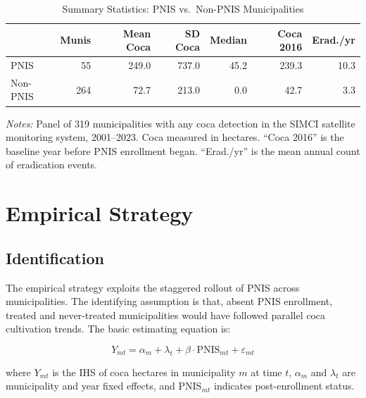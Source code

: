 \documentclass[12pt]{article}
\begin{document}
\begin{table}[H]
\centering
\caption{Summary Statistics: PNIS vs.\ Non-PNIS Municipalities}
\label{tab:summary}
\begin{tabular}{lrrrrrr}
\toprule
 & Munis & Mean Coca & SD Coca & Median & Coca 2016 & Erad./yr \\
\midrule
PNIS & 55 & 249.0 & 737.0 & 45.2 & 239.3 & 10.3 \\
Non-PNIS & 264 & 72.7 & 213.0 & 0.0 & 42.7 & 3.3 \\
\bottomrule
\end{tabular}
\begin{tablenotes}[flushleft]\small
\item \textit{Notes:} Panel of 319 municipalities with any coca detection in the SIMCI satellite monitoring system, 2001--2023. Coca measured in hectares. ``Coca 2016'' is the baseline year before PNIS enrollment began. ``Erad./yr'' is the mean annual count of eradication events.
\end{tablenotes}
\end{table}

\section{Empirical Strategy} \label{sec:empirical}

\subsection{Identification}

The empirical strategy exploits the staggered rollout of PNIS across municipalities. The identifying assumption is that, absent PNIS enrollment, treated and never-treated municipalities would have followed parallel coca cultivation trends. The basic estimating equation is:

\begin{equation}
Y_{mt} = \alpha_m + \lambda_t + \beta \cdot \text{PNIS}_{mt} + \varepsilon_{mt}
\label{eq:twfe}
\end{equation}

\noindent where $Y_{mt}$ is the IHS of coca hectares in municipality $m$ at time $t$, $\alpha_m$ and $\lambda_t$ are municipality and year fixed effects, and $\text{PNIS}_{mt}$ indicates post-enrollment status.
\end{document}
